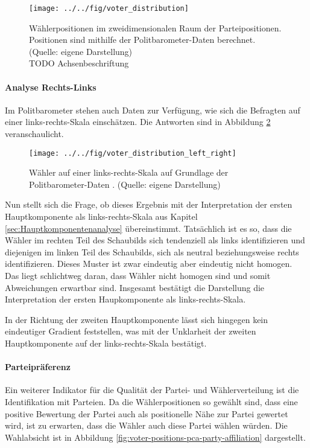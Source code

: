 \begin{figure}[htb]
	\centering
	\texttt{[image: ../../fig/voter\_distribution]}
	\caption{Wählerpositionen im zweidimensionalen Raum der Parteipositionen. Positionen sind mithilfe der Politbarometer-Daten \citep{politbarometer} berechnet. (Quelle: eigene Darstellung)\\TODO Achsenbeschriftung}
	\label{fig:voter-positions-pca}
\end{figure}

\paragraph{Analyse Rechts-Links}
Im Politbarometer stehen auch Daten zur Verfügung, wie sich die Befragten auf einer links-rechts-Skala einschätzen. Die Antworten sind in Abbildung \ref{fig:voter-positions-pca-left-right} veranschaulicht.

\begin{figure}[htb]
	\centering
	\texttt{[image: ../../fig/voter\_distribution\_left\_right]}
	\caption{Wähler auf einer links-rechts-Skala auf Grundlage der Politbarometer-Daten \citep{politbarometer}. (Quelle: eigene Darstellung)}
	\label{fig:voter-positions-pca-left-right}
\end{figure}

Nun stellt sich die Frage, ob dieses Ergebnis mit der Interpretation der ersten Hauptkomponente als links-rechts-Skala aus Kapitel \ref{sec:Hauptkomponentenanalyse} übereinstimmt.
Tatsächlich ist es so, dass die Wähler im rechten Teil des Schaubilds sich tendenziell als links identifizieren und diejenigen im linken Teil des Schaubilds, sich als neutral beziehungsweise rechts identifizieren.
Dieses Muster ist zwar eindeutig aber eindeutig nicht homogen. Das liegt schlichtweg daran, dass Wähler nicht homogen sind und somit Abweichungen erwartbar sind.
Insgesamt bestätigt die Darstellung die Interpretation der ersten Haupkomponente als links-rechts-Skala.

In der Richtung der zweiten Hauptkomponente lässt sich hingegen kein eindeutiger Gradient feststellen, was mit der Unklarheit der zweiten Hauptkomponente auf der links-rechts-Skala bestätigt.

\paragraph{Parteipräferenz}

Ein weiterer Indikator für die Qualität der Partei- und Wählerverteilung ist die Identifikation mit Parteien. Da die Wählerpositionen so gewählt sind, dass eine positive Bewertung der Partei auch als positionelle Nähe zur Partei gewertet wird, ist zu erwarten, dass die Wähler auch diese Partei wählen würden. Die Wahlabsicht ist in Abbildung \ref{fig:voter-positions-pca-party-affiliation} dargestellt.

